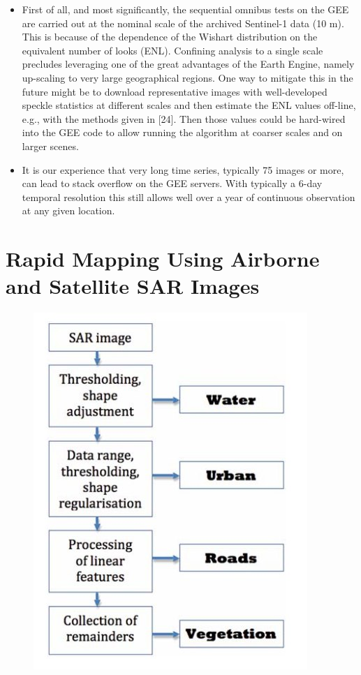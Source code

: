 \documentclass[paper=a4, fontsize=11pt]{scrartcl}
\begin{document}
\begin{itemize}
\begin{itemize}
            \item First of all, and most significantly, the sequential omnibus tests on the   GEE are carried out at the nominal scale of the archived Sentinel-1 data (10 m). This is because of the dependence of the Wishart distribution on the equivalent number of looks (ENL). Confining analysis to a single scale precludes leveraging one of the great advantages of the Earth Engine, namely up-scaling to very large geographical regions. One way to mitigate this in the future might be to download representative images with well-developed speckle statistics at different scales and then estimate the ENL values off-line, e.g., with the methods given in [24]. Then those values could be hard-wired into the GEE code to allow running the algorithm at coarser scales and on larger scenes.
            \item It is our experience that very long time series, typically 75 images or more, can lead to stack overflow on the GEE servers. With typically a 6-day temporal resolution this still allows well over a year of continuous observation at any given  location.
        \end{itemize}
\end{itemize}

\newpage

\section*{Rapid Mapping Using Airborne and Satellite SAR Images}


\begin{figure}[hbt]
	\centering
	\includegraphics[width=0.35\linewidth]{Figures/ProcessingSteps.jpg}
	\label{Fig:ProcessingSteps}
\end{figure}
\end{document}
